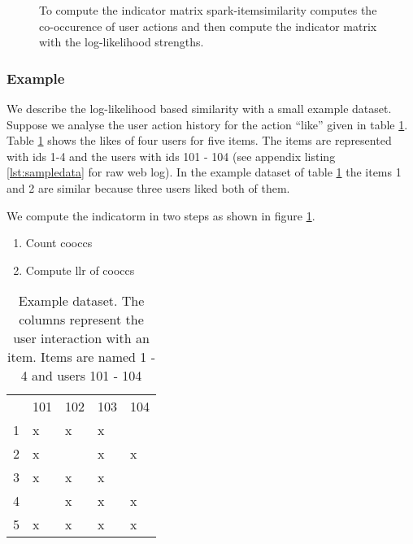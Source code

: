 \begin{figure}
\centering
{}
\caption{To compute the indicator matrix {\ttfamily spark-itemsimilarity} computes the co-occurence  of user actions and then compute the indicator matrix with the log-likelihood strengths.}
\label{fig:llrworkflow}
\end{figure}

\subsubsection{Example}
\label{sec:llrexample}

We describe the log-likelihood based similarity with a small example dataset. Suppose we analyse the user action history for the action ``like'' given in table \ref{tbl:llr1}. 
Table \ref{tbl:llr1} shows the likes of four users for five items. The items are represented with ids 1-4 and the users with ids 101 - 104  (see appendix listing \ref{lst:sampledata} for raw web log).
In the example dataset of table \ref{tbl:llr1} the items 1 and 2 are similar because three users liked both of them.

We compute the \gls{indicatorm} in two steps as shown in figure \ref{fig:llrworkflow}.
\begin{enumerate}
\item Count \glspl{coocc}
\item Compute \gls{llr} of \glspl{coocc}
\end{enumerate}

\begin{table}
\begin{center}
\begin{tabular}{rllll}
 & 101 & 102 & 103 & 104\\
1 & x & x & x &  \\
2 & x &   & x & x\\
3 & x & x & x &  \\
4 &   & x & x & x\\
5 & x & x & x & x\\
\end{tabular}
\end{center}
\caption{Example dataset. The columns represent the user interaction with an item. Items are named 1 - 4 and users 101 - 104}
\label{tbl:llr1}
\end{table}

